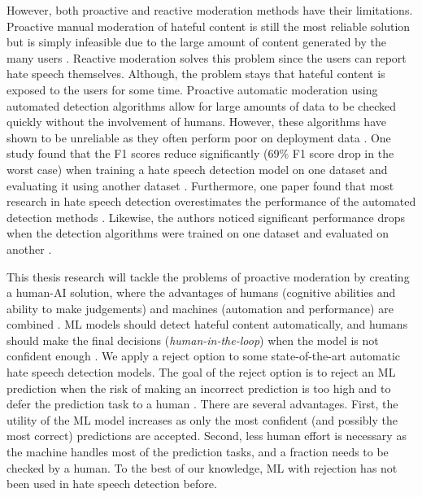 %
However, both proactive and reactive moderation methods have their limitations.
%
Proactive manual moderation of hateful content is still the most reliable solution but is simply infeasible due to the large amount of content generated by the many users \citep{balayn2021automatic}.
%
Reactive moderation solves this problem since the users can report hate speech themselves.
%
Although, the problem stays that hateful content is exposed to the users for some time.
%
Proactive automatic moderation using automated detection algorithms allow for large amounts of data to be checked quickly without the involvement of humans.
%
However, these algorithms have shown to be unreliable as they often perform poor on deployment data \citep{balayn2021automatic, grondahl2018all, arango2019hate}.
%
One study found that the F1 scores reduce significantly (69\% F1 score drop in the worst case) when training a hate speech detection model on one dataset and evaluating it using another dataset \citep{grondahl2018all}.
%
Furthermore, one paper found that most research in hate speech detection overestimates the performance of the automated detection methods \citep{arango2019hate}.
%
Likewise, the authors noticed significant performance drops when the detection algorithms were trained on one dataset and evaluated on another \citep{arango2019hate}.
%

%
This thesis research will tackle the problems of proactive moderation by creating a human-AI solution, where the advantages of humans (cognitive abilities and ability to make judgements) and machines (automation and performance) are combined \citep{woo2020future}.
%
%
ML models should detect hateful content automatically, and humans should make the final decisions (\textit{human-in-the-loop}) when the model is not confident enough \citep{woo2020future}.
%
%
We apply a reject option to some state-of-the-art automatic hate speech detection models.
%
The goal of the reject option is to reject an ML prediction when the risk of making an incorrect prediction is too high and to defer the prediction task to a human \citep{hendrickx2021machine}.
%
There are several advantages.
%
First, the utility of the ML model increases as only the most confident (and possibly the most correct) predictions are accepted.
%
Second, less human effort is necessary as the machine handles most of the prediction tasks, and a fraction needs to be checked by a human.
%
To the best of our knowledge, ML with rejection has not been used in hate speech detection before.
%

